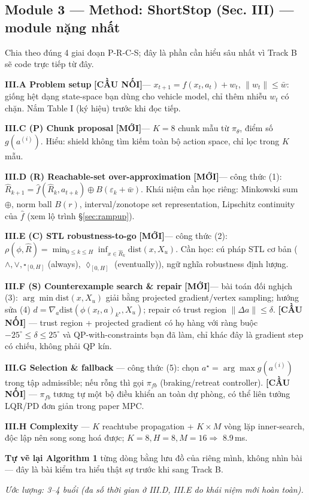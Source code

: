 \documentclass[a4paper,12pt]{article}
\newcommand{\new}{\textcolor{red!60!black}{\textbf{[MỚI]}}}
\newcommand{\bridge}{\textcolor{blue!50!black}{\textbf{[CẦU NỐI]}}}
\begin{document}
\subsection{Module 3 --- Method: ShortStop (Sec. III) --- module nặng nhất}
Chia theo đúng 4 giai đoạn P-R-C-S; đây là phần cần hiểu sâu nhất vì Track B sẽ code trực tiếp từ đây.

\begin{tasklist}
  \item[\square] \textbf{III.A Problem setup} \bridge — $x_{t+1} = f(x_t,a_t) + w_t$, $\|w_t\|\le \bar w$: giống hệt dạng state-space bạn dùng cho vehicle model, chỉ thêm nhiễu $w_t$ có chặn. Nắm Table I (ký hiệu) trước khi đọc tiếp.
  \item[\square] \textbf{III.C (P) Chunk proposal} \new — $K=8$ chunk mẫu từ $\pi_\theta$, điểm số $g(a^{(i)})$. Hiểu: shield không tìm kiếm toàn bộ action space, chỉ lọc trong $K$ mẫu.
  \item[\square] \textbf{III.D (R) Reachable-set over-approximation} \new — công thức (1): $\hat R_{k+1} = \hat f(\hat R_k, a_{t+k}) \oplus B(\varepsilon_k + \bar w)$. Khái niệm cần học riêng: Minkowski sum $\oplus$, norm ball $B(r)$, interval/zonotope set representation, Lipschitz continuity của $\hat f$ (xem lộ trình \S\ref{sec:rampup}).
  \item[\square] \textbf{III.E (C) STL robustness-to-go} \new — công thức (2): $\rho(\phi,\hat R) = \min_{0\le k\le H} \inf_{x\in\hat R_k} \mathrm{dist}(x,X_u)$. Cần học: cú pháp STL cơ bản ($\wedge,\vee,\square_{[0,H]}$ (always), $\lozenge_{[0,H]}$ (eventually)), ngữ nghĩa robustness định lượng.
  \item[\square] \textbf{III.F (S) Counterexample search \& repair} \new — bài toán đối nghịch (3): $\arg\min \mathrm{dist}(x,X_u)$ giải bằng projected gradient/vertex sampling; hướng sửa (4) $d=\nabla_a \mathrm{dist}(\phi(x_t,a)_{k^\star},X_u)$; repair có trust region $\|\Delta a\|\le\delta$. \bridge{} — trust region + projected gradient có họ hàng với ràng buộc $-25^\circ\le\delta\le25^\circ$ và QP-with-constraints bạn đã làm, chỉ khác đây là gradient step có chiếu, không phải QP kín.
  \item[\square] \textbf{III.G Selection \& fallback} — công thức (5): chọn $a^\star=\arg\max g(a^{(i)})$ trong tập admissible; nếu rỗng thì gọi $\pi_{fb}$ (braking/retreat controller). \bridge{} — $\pi_{fb}$ tương tự một bộ điều khiển an toàn dự phòng, có thể liên tưởng LQR/PD đơn giản trong paper MPC.
  \item[\square] \textbf{III.H Complexity} — $K$ reachtube propagation + $K\times M$ vòng lặp inner-search, độc lập nên song song hoá được; $K{=}8,H{=}8,M{=}16 \Rightarrow$ 8.9\,ms.
  \item[\square] \textbf{Tự vẽ lại Algorithm 1} từng dòng bằng lưu đồ của riêng mình, không nhìn bài — đây là bài kiểm tra hiểu thật sự trước khi sang Track B.
\end{tasklist}
\textit{Ước lượng: 3--4 buổi (đa số thời gian ở III.D, III.E do khái niệm mới hoàn toàn).}
\end{document}
